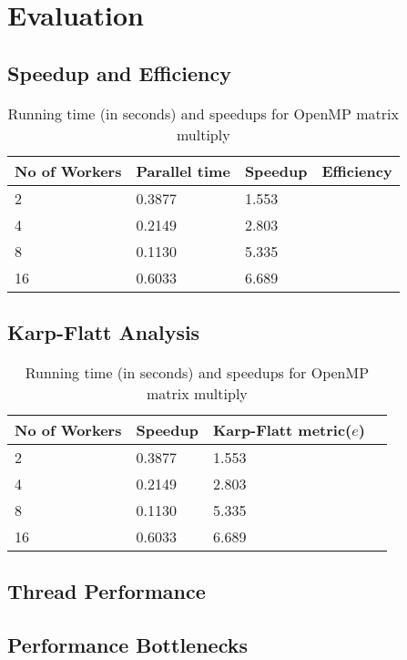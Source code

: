 \documentclass[12pt]{article}
\begin{document}
\section{Evaluation}
\subsection{Speedup and Efficiency}
\begin{table*}[ht]
\centering
\begin{tabular}{|l|l|l|l|}
\hline
 No of Workers & Parallel time  & Speedup & Efficiency\\ \hline
 2  & 0.3877    & 1.553  & \\ \hline
 4  & 0.2149    & 2.803  & \\ \hline
 8  & 0.1130    & 5.335  &\\ \hline
 16 & 0.6033    & 6.689  & \\ \hline
\end{tabular}
\caption{Running time (in seconds) and speedups for OpenMP matrix multiply}
\label{omp-table}
\end{table*}

\subsection{Karp-Flatt Analysis}
\begin{table*}[ht]
\centering
\begin{tabular}{|l|l|l|l|}
\hline
 No of Workers & Speedup  & Karp-Flatt metric($e$) \\ \hline
 2  & 0.3877    & 1.553   \\ \hline
 4  & 0.2149    & 2.803   \\ \hline
 8  & 0.1130    & 5.335  \\ \hline
 16 & 0.6033    & 6.689   \\ \hline
\end{tabular}
\caption{Running time (in seconds) and speedups for OpenMP matrix multiply}
\label{omp-table}
\end{table*}


\subsection{Thread Performance}
\subsection{Performance Bottlenecks}
\end{document}
